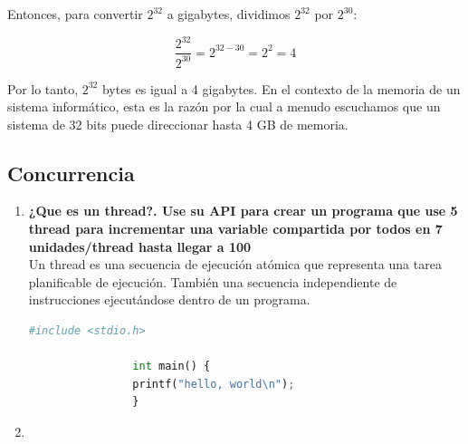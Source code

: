 \documentclass[../main.tex]{subfiles}
\begin{document}
\begin{exercise}
        Entonces, para convertir \(2^{32}\) a gigabytes, dividimos \(2^{32}\) por \(2^{30}\):

        \[ \frac{2^{32}}{2^{30}} = 2^{32-30} = 2^2 = 4 \]

        Por lo tanto, \(2^{32}\) bytes es igual a 4 gigabytes. En el contexto de la memoria de un sistema informático, esta es la razón por la cual a menudo escuchamos que un sistema de 32 bits puede direccionar hasta 4 GB de memoria.
    \end{exercise}

\subsection{Concurrencia}
    \begin{enumerate}
        \item 
            \textbf{¿Que es un thread?. Use su API para crear un programa que use 5 thread para incrementar una  variable compartida por todos en 7 unidades/thread hasta llegar a 100}\\
            Un thread es una secuencia de ejecución atómica que representa una tarea planificable de ejecución. También una secuencia independiente de instrucciones ejecutándose dentro de un programa.
            
            \begin{lstlisting}[language=Python, caption=hola mundo.]
                #include <stdio.h>
    
                int main() {
                printf("hello, world\n");
                }
            \end{lstlisting}
        \item
    \end{enumerate}
\end{document}
